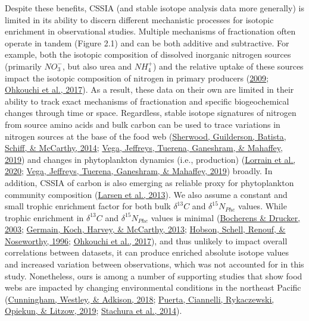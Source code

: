 \documentclass [11pt, proquest] {uwthesis}[2015/03/03]
\begin{document}
Despite these benefits, CSSIA (and stable isotope analysis data more generally) is limited in its ability to discern different mechanistic processes for isotopic enrichment in observational studies. Multiple mechanisms of fractionation often operate in tandem (Figure 2.1) and can be both additive and subtractive. For example, both the isotopic composition of dissolved inorganic nitrogen sources (primarily \(NO_3^-\), but also urea and \(NH_4^+\)) and the relative uptake of these sources impact the isotopic composition of nitrogen in primary producers (\protect\hyperlink{ref-Graham2010}{2009}; \protect\hyperlink{ref-Ohkouchi2017}{Ohkouchi et al., 2017}). As a result, these data on their own are limited in their ability to track exact mechanisms of fractionation and specific biogeochemical changes through time or space. Regardless, stable isotope signatures of nitrogen from source amino acids and bulk carbon can be used to trace variations in nitrogen sources at the base of the food web (\protect\hyperlink{ref-Sherwood2014}{Sherwood, Guilderson, Batista, Schiff, \& McCarthy, 2014}; \protect\hyperlink{ref-delaVega2019}{Vega, Jeffreys, Tuerena, Ganeshram, \& Mahaffey, 2019}) and changes in phytoplankton dynamics (i.e., production) (\protect\hyperlink{ref-Lorrain2020}{Lorrain et al., 2020}; \protect\hyperlink{ref-delaVega2019}{Vega, Jeffreys, Tuerena, Ganeshram, \& Mahaffey, 2019}) broadly. In addition, CSSIA of carbon is also emerging as reliable proxy for phytoplankton community composition (\protect\hyperlink{ref-Larsen2013}{Larsen et al., 2013}). We also assume a constant and small trophic enrichment factor for both bulk \(\delta^{13}C\) and \(\delta^{15}N_{Phe}\) values. While trophic enrichment in \(\delta^{13}C\) and \(\delta^{15}N_{Phe}\) values is minimal (\protect\hyperlink{ref-Bocherens2003}{Bocherens \& Drucker, 2003}; \protect\hyperlink{ref-Germain2013}{Germain, Koch, Harvey, \& McCarthy, 2013}; \protect\hyperlink{ref-Hobson1996}{Hobson, Schell, Renouf, \& Noseworthy, 1996}; \protect\hyperlink{ref-Ohkouchi2017}{Ohkouchi et al., 2017}), and thus unlikely to impact overall correlations between datasets, it can produce enriched absolute isotope values and increased variation between observations, which was not accounted for in this study. Nonetheless, ours is among a number of supporting studies that show food webs are impacted by changing environmental conditions in the northeast Pacific (\protect\hyperlink{ref-Cunningham2018}{Cunningham, Westley, \& Adkison, 2018}; \protect\hyperlink{ref-Puerta2019}{Puerta, Ciannelli, Rykaczewski, Opiekun, \& Litzow, 2019}; \protect\hyperlink{ref-Stachura2014}{Stachura et al., 2014}).
\end{document}
